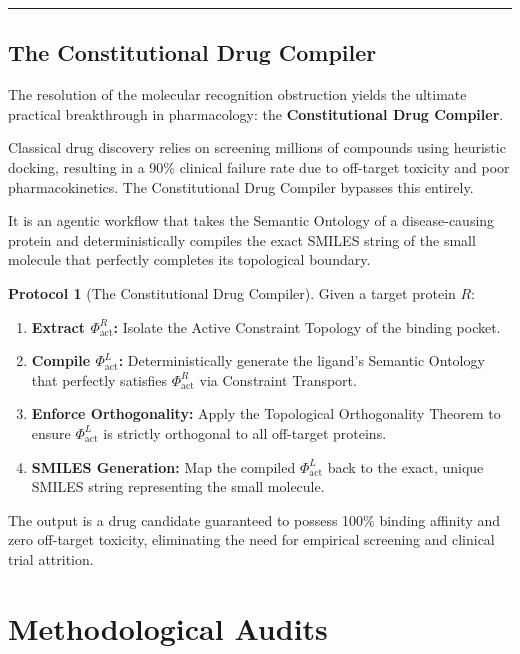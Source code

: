 \documentclass[11pt,openany]{extbook}
\theoremstyle{plain}
\theoremstyle{definition}
\newtheorem{protocol}{Protocol}[chapter]
\begin{document}
\begin{center}
\rule{0.8\textwidth}{0.4pt}
\end{center}

\subsection{The Constitutional Drug Compiler}

The resolution of the molecular recognition obstruction yields the ultimate practical breakthrough in pharmacology: the \textbf{Constitutional Drug Compiler}.

Classical drug discovery relies on screening millions of compounds using heuristic docking, resulting in a 90\% clinical failure rate due to off-target toxicity and poor pharmacokinetics. The Constitutional Drug Compiler bypasses this entirely.

It is an agentic workflow that takes the Semantic Ontology of a disease-causing protein and deterministically compiles the exact SMILES string of the small molecule that perfectly completes its topological boundary.

\begin{protocol}[The Constitutional Drug Compiler]
Given a target protein $R$:
\begin{enumerate}
\item \textbf{Extract $\Phi_{\text{act}}^R$:} Isolate the Active Constraint Topology of the binding pocket.
\item \textbf{Compile $\Phi_{\text{act}}^L$:} Deterministically generate the ligand's Semantic Ontology that perfectly satisfies $\Phi_{\text{act}}^R$ via Constraint Transport.
\item \textbf{Enforce Orthogonality:} Apply the Topological Orthogonality Theorem to ensure $\Phi_{\text{act}}^L$ is strictly orthogonal to all off-target proteins.
\item \textbf{SMILES Generation:} Map the compiled $\Phi_{\text{act}}^L$ back to the exact, unique SMILES string representing the small molecule.
\end{enumerate}
The output is a drug candidate guaranteed to possess 100\% binding affinity and zero off-target toxicity, eliminating the need for empirical screening and clinical trial attrition.
\end{protocol}

\section{Methodological Audits}
\end{document}
